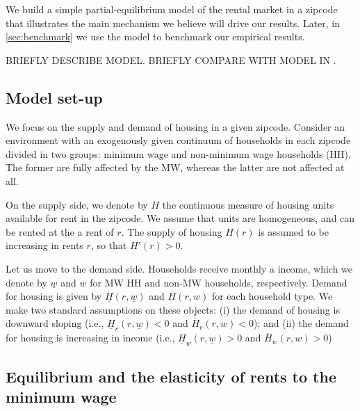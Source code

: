 
We build a simple partial-equilibrium model of the rental market in a zipcode that illustrates 
the main mechanism we believe will drive our results. Later, in \autoref{sec:benchmark} we 
use the model to benchmark our empirical results.

BRIEFLY DESCRIBE MODEL. BRIEFLY COMPARE WITH MODEL IN \textcite{yamagishi2019minimum}.


\subsection{Model set-up}

We focus on the supply and demand of housing in a given zipcode. Consider an environment with 
an exogenously given continuum of households in each zipcode divided in two groups: minimum wage 
and non-minimum wage households (HH). The former are fully affected by the MW, whereas the latter 
are not affected at all.

On the supply side, we denote by $H$ the continuous measure of housing units available for rent 
in the zipcode. We assume that units are homogeneous, and can be rented at the a rent of $r$. The 
supply of housing $H(r)$ is assumed to be increasing in rents $r$, so that $H'(r) > 0$.

Let us move to the demand side. Households receive monthly a income, which we denote by 
$\underline{w}$ and $w$ for MW HH and non-MW households, respectively. Demand for housing is given 
by $\underline{H}(r, \underline{w})$ and $\overline{H}(r, w)$ for each household type. We make two 
standard assumptions on these objects: (i) the demand of housing is downward sloping (i.e., 
$\underline{H}_r(r, \underline{w}) < 0$ and $\overline{H}_r(r, w) < 0$); and (ii) the demand for 
housing is increasing in income (i.e., $\underline{H}_w(r, \underline{w}) > 0$ and $\overline{H}_w(r, 
w) > 0$)


\subsection{Equilibrium and the elasticity of rents to the minimum wage}

